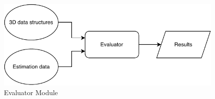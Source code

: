 \begin{figure}[H]
    \begin{center}
    \includegraphics[width=\textwidth]{figures/approach/figEvaluator.pdf}
    \end{center}
    \caption[Evaluator Module]{Evaluator Module}
    \label{fig:evaluator}
\end{figure}
